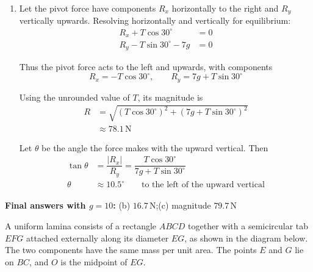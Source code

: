 \documentclass[leqno]{article}
\begin{document}
\begin{enumerate}[
  label=\textbf{\arabic*.},
  leftmargin=*,
  topsep=0pt,
  partopsep=0pt,
  parsep=0pt
]
\begin{djsSolution}
\begin{enumerate}[label=\textbf{(\alph*)}, start=2]
The tension \(T\) has horizontal component \(T\cos30^\circ\), acting at \(B\), where \(AB=8a\). Its vertical component acts along \(AB\), so has no moment about \(A\).

Taking moments about \(A\), and using part (a):
\begin{align*}
8aT\cos30^\circ&=7g\left(\dfrac{(128-6\pi)a}{21\pi}\right)\\
T&=\dfrac{7g}{8\cos30^\circ}\times\dfrac{128-6\pi}{21\pi}
\end{align*}

Using \(g=9.8\,\mathrm{m\,s^{-2}}\), the tension is
\[
T\approx16.4\,\mathrm{N}
\]

\item Let the pivot force have components \(R_x\) horizontally to the right and \(R_y\) vertically upwards. Resolving horizontally and vertically for equilibrium:
\begin{align*}
R_x+T\cos30^\circ&=0\\
R_y-T\sin30^\circ-7g&=0
\end{align*}

Thus the pivot force acts to the left and upwards, with components
\[
R_x=-T\cos30^\circ,
\qquad R_y=7g+T\sin30^\circ
\]

Using the unrounded value of \(T\), its magnitude is
\begin{align*}
R&=\sqrt{(T\cos30^\circ)^2+(7g+T\sin30^\circ)^2}\\
&\approx78.1\,\mathrm{N}
\end{align*}

Let \(\theta\) be the angle the force makes with the upward vertical. Then
\begin{align*}
\tan\theta&=\dfrac{|R_x|}{R_y}
=\dfrac{T\cos30^\circ}{7g+T\sin30^\circ}\\
\theta&\approx10.5^\circ\qquad\text{to the left of the upward vertical}
\end{align*}

\end{enumerate}
\par\medskip\noindent\textbf{Final answers with \(g = 10\):} (b) \(16.7\,\mathrm{N}\);\quad (c) magnitude \(79.7\,\mathrm{N}\)
\end{djsSolution}

\newpage

\questionitem

A uniform lamina consists of a rectangle $ABCD$ together with a semicircular tab $EFG$ attached externally along its diameter $EG$, as shown in the diagram below.
The two components have the same mass per unit area.
The points $E$ and $G$ lie on $BC$, and $O$ is the midpoint of $EG$.


\end{enumerate}
\end{document}
